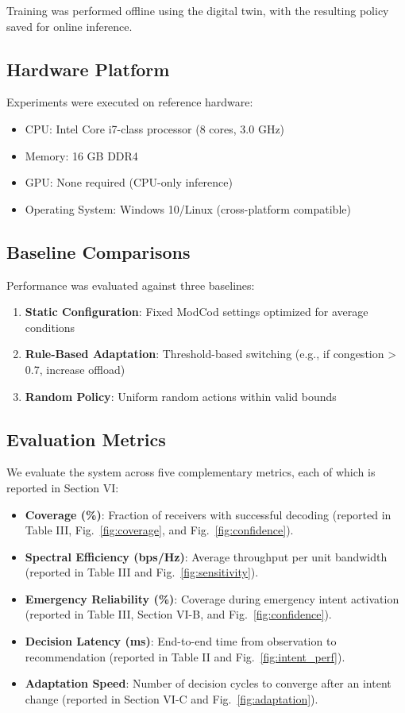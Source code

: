 \documentclass[conference]{IEEEtran}
\begin{document}
Training was performed offline using the digital twin, with the resulting policy saved for online inference.

\subsection{Hardware Platform}

Experiments were executed on reference hardware:
\begin{itemize}
\item CPU: Intel Core i7-class processor (8 cores, 3.0 GHz)
\item Memory: 16 GB DDR4
\item GPU: None required (CPU-only inference)
\item Operating System: Windows 10/Linux (cross-platform compatible)
\end{itemize}

\subsection{Baseline Comparisons}

Performance was evaluated against three baselines:

\begin{enumerate}
\item \textbf{Static Configuration}: Fixed ModCod settings optimized for average conditions
\item \textbf{Rule-Based Adaptation}: Threshold-based switching (e.g., if congestion > 0.7, increase offload)
\item \textbf{Random Policy}: Uniform random actions within valid bounds
\end{enumerate}

\subsection{Evaluation Metrics}

We evaluate the system across five complementary metrics, each of which is reported in Section VI:

\begin{itemize}
\item \textbf{Coverage (\%)}: Fraction of receivers with successful decoding (reported in Table III, Fig.~\ref{fig:coverage}, and Fig.~\ref{fig:confidence}).
\item \textbf{Spectral Efficiency (bps/Hz)}: Average throughput per unit bandwidth (reported in Table III and Fig.~\ref{fig:sensitivity}).
\item \textbf{Emergency Reliability (\%)}: Coverage during emergency intent activation (reported in Table III, Section VI-B, and Fig.~\ref{fig:confidence}).
\item \textbf{Decision Latency (ms)}: End-to-end time from observation to recommendation (reported in Table II and Fig.~\ref{fig:intent_perf}).
\item \textbf{Adaptation Speed}: Number of decision cycles to converge after an intent change (reported in Section VI-C and Fig.~\ref{fig:adaptation}).
\end{itemize}
\end{document}
